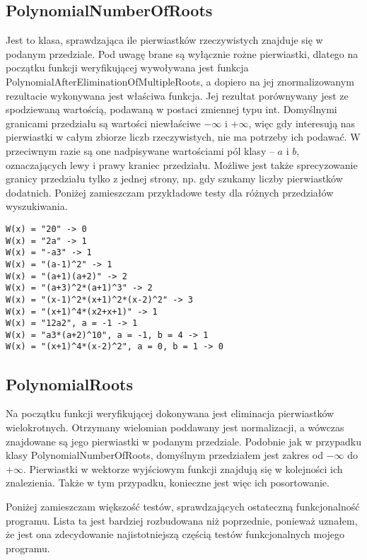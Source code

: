 \documentclass[twoside,a4paper]{book}
\begin{document}
\subsection{PolynomialNumberOfRoots}

Jest to klasa, sprawdzająca ile pierwiastków rzeczywistych znajduje się w podanym przedziale. Pod uwagę brane są wyłącznie rożne pierwiastki, dlatego na początku funkcji weryfikującej wywoływana jest funkcja PolynomialAfterEliminationOfMultipleRoots, a dopiero na jej znormalizowanym rezultacie wykonywana jest właściwa funkcja. Jej rezultat porównywany jest ze spodziewaną wartością, podawaną w postaci zmiennej typu int. Domyślnymi granicami przedziału są wartości niewłaściwe $-\infty$ i $+\infty$, więc gdy interesują nas pierwiastki w całym zbiorze liczb rzeczywistych, nie ma potrzeby ich podawać. W przeciwnym razie są one nadpisywane wartościami pól klasy – $a$ i $b$, oznaczających lewy i prawy kraniec przedziału. Możliwe jest także sprecyzowanie granicy przedziału tylko z jednej strony, np. gdy szukamy liczby pierwiastków dodatnich. Poniżej zamieszczam przykładowe testy dla różnych przedziałów wyszukiwania.

\begin{lstlisting}
W(x) = "20" -> 0
W(x) = "2a" -> 1
W(x) = "-a3" -> 1
W(x) = "(a-1)^2" -> 1
W(x) = "(a+1)(a+2)" -> 2
W(x) = "(a+3)^2*(a+1)^3" -> 2
W(x) = "(x-1)^2*(x+1)^2*(x-2)^2" -> 3
W(x) = "(x+1)^4*(x2+x+1)" -> 1
W(x) = "12a2", a = -1 -> 1
W(x) = "a3*(a+2)^10", a = -1, b = 4 -> 1
W(x) = "(x+1)^4*(x-2)^2", a = 0, b = 1 -> 0
\end{lstlisting}

\subsection{PolynomialRoots}

Na początku funkcji weryfikującej dokonywana jest eliminacja pierwiastków wielokrotnych. Otrzymany wielomian poddawany jest normalizacji, a wówczas znajdowane są jego pierwiastki w podanym przedziale. Podobnie jak w przypadku klasy PolynomialNumberOfRoots, domyślnym przedziałem jest zakres od $-\infty$ do $+\infty$. Pierwiastki w wektorze wyjściowym funkcji znajdują się w kolejności ich znalezienia. Także w tym przypadku, konieczne jest więc ich posortowanie.

Poniżej zamieszczam większość testów, sprawdzających ostateczną funkcjonalność programu. Lista ta jest bardziej rozbudowana niż poprzednie, ponieważ uznałem, że jest ona zdecydowanie najistotniejszą częścią testów funkcjonalnych mojego programu.
\end{document}
